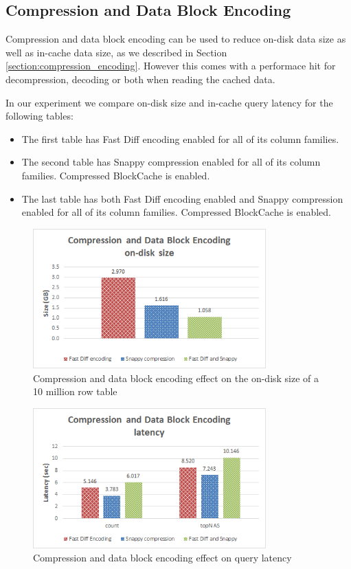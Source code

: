 \subsection{Compression and Data Block Encoding}\label{subsection:benchmarks_compression_encoding}

Compression and data block encoding can be used to reduce on-disk data size as well as in-cache data size, as we described in Section \ref{section:compression_encoding}. However this comes with a performace hit for decompression, decoding or both when reading the cached data.

In our experiment we compare on-disk size and in-cache query latency for the following tables:
\begin{itemize}
\item The first table has Fast Diff encoding enabled for all of its column families.
\item The second table has Snappy compression enabled for all of its column families. Compressed BlockCache is enabled.
\item The last table has both Fast Diff encoding enabled and Snappy compression enabled for all of its column families. Compressed BlockCache is enabled.
\end{itemize}

\begin{figure}[H]
\centering
\includegraphics[width=0.8\textwidth]{figures/benchmarks_hbase_compression_encoding_size}
\caption{Compression and data block encoding effect on the on-disk size of a 10 million row table}
\label{figure:benchmarks_hbase_compression_encoding_size}
\end{figure}

\begin{figure}[H]
\centering
\includegraphics[width=0.8\textwidth]{figures/benchmarks_hbase_compression_encoding_latency}
\caption{Compression and data block encoding effect on query latency}
\label{figure:benchmarks_hbase_compression_encoding_latency}
\end{figure}

